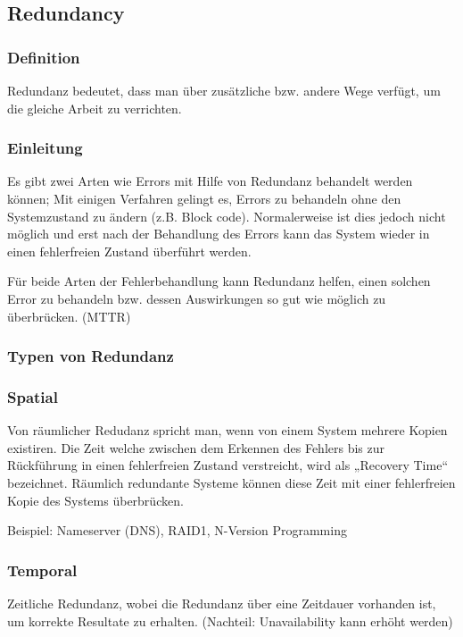 \subsection{Redundancy}


\subsubsection*{Definition}


Redundanz bedeutet, dass man über zusätzliche bzw. andere Wege verfügt, um die gleiche Arbeit zu verrichten.

\subsubsection*{Einleitung}

Es gibt zwei Arten wie Errors mit Hilfe von Redundanz behandelt werden können; Mit einigen Verfahren gelingt es, Errors zu behandeln ohne den Systemzustand zu ändern (z.B. Block code). Normalerweise ist dies jedoch nicht möglich und erst nach der Behandlung des Errors kann das System wieder in einen fehlerfreien Zustand überführt werden.

Für beide Arten der Fehlerbehandlung kann Redundanz helfen, einen solchen Error zu behandeln bzw. dessen Auswirkungen so gut wie möglich zu überbrücken. (MTTR)

\subsubsection*{Typen von Redundanz}

\subsubsection*{Spatial}

Von räumlicher Redudanz spricht man, wenn von einem System mehrere Kopien existiren. Die Zeit welche zwischen dem Erkennen des Fehlers bis zur Rückführung in einen fehlerfreien Zustand verstreicht, wird als „Recovery Time“  bezeichnet. Räumlich redundante Systeme können diese Zeit mit einer fehlerfreien Kopie des Systems überbrücken.

Beispiel: Nameserver (DNS), RAID1, N-Version Programming

\subsubsection*{Temporal}

Zeitliche Redundanz, wobei die Redundanz über eine Zeitdauer vorhanden ist, um korrekte Resultate zu erhalten. (Nachteil: Unavailability kann erhöht werden)

